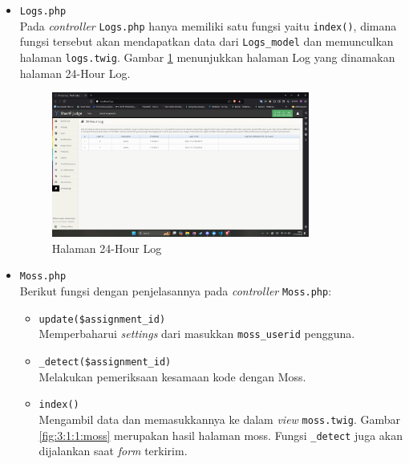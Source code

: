 \documentclass[a4paper,twoside]{article}
\begin{document}
\begin{enumerate}
\begin{itemize}
\begin{itemize}
			            \item \verb|Logs.php| \\
			                  Pada \textit{controller} \verb|Logs.php| hanya memiliki satu fungsi yaitu \verb|index()|, dimana fungsi tersebut akan mendapatkan data dari \verb|Logs_model| dan memunculkan halaman \verb|logs.twig|. Gambar \ref{fig:3:1:1:log} menunjukkan halaman Log yang dinamakan halaman 24-Hour Log.

			                  \begin{figure}[H]
				                  \centering
				                  \includegraphics[width=0.8\textwidth]{views/log.png}
				                  \caption{Halaman 24-Hour Log}
				                  \label{fig:3:1:1:log}
			                  \end{figure}


			            \item \verb|Moss.php| \\
			                  Berikut fungsi dengan penjelasannya pada \textit{controller} \verb|Moss.php|:

			                  \begin{itemize}
				                  \item \verb|update($assignment_id)| \\
				                        Memperbaharui \textit{settings} dari masukkan \verb|moss_userid| pengguna.
				                  \item \verb|_detect($assignment_id)| \\
				                        Melakukan pemeriksaan kesamaan kode dengan Moss.
				                  \item \verb|index()| \\
				                        Mengambil data dan memasukkannya ke dalam \textit{view} \verb|moss.twig|. Gambar \ref{fig:3:1:1:moss} merupakan hasil halaman moss. Fungsi \verb|_detect| juga akan dijalankan saat \textit{form} terkirim.


\end{itemize}
\end{itemize}
\end{itemize}
\end{enumerate}
\end{document}
